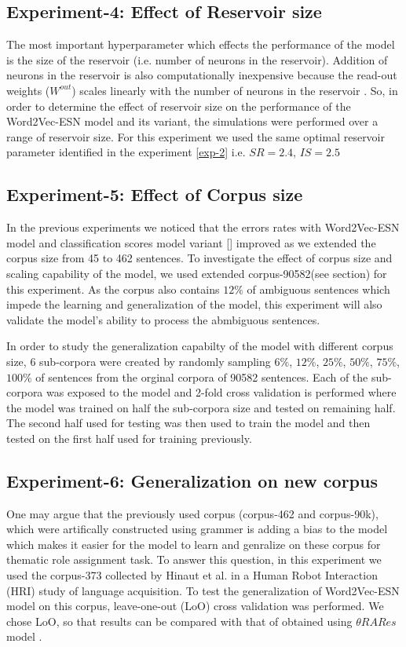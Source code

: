 \subsection{Experiment-4: Effect of Reservoir size}

The most important hyperparameter which effects the performance of the model is the size of the reservoir (i.e. number of neurons in the reservoir). Addition of neurons in the reservoir is also computationally inexpensive because the read-out weights ($W^{out}$) scales linearly with the number of neurons in the reservoir \cite{esn:learn_gs}. So, in order to determine the effect of reservoir size on the performance of the Word2Vec-ESN model and its variant, the simulations were performed over a range of reservoir size. For this experiment we used the same optimal reservoir parameter identified in the experiment \ref{exp-2} i.e. $ SR = 2.4$, $IS=2.5$

\subsection{Experiment-5: Effect of Corpus size}

In the previous experiments we noticed that the errors rates with Word2Vec-ESN model and classification scores model variant [] improved as we extended the corpus size from 45 to 462 sentences. To investigate the effect of corpus size and scaling capability of the model, we used extended corpus-90582(see section) for this experiment. As the corpus also contains $12\%$ of ambiguous sentences which impede the learning and generalization of the model, this experiment will also validate the model's ability to process the abmbiguous sentences.

In order to study the generalization capabilty of the model with different corpus size,  6 sub-corpora were created by randomly sampling $6\%$, $12\%$, $25\%$, $50\%$, $75\%$, $100\%$ of sentences from the orginal corpora of 90582 sentences\cite{end-to-end}. Each of the sub-corpora was exposed to the model and 2-fold cross validation is performed where the model was trained on half the sub-corpora size and tested on remaining half. The second half used for testing was then used to train the model and then tested on the first half used for training previously.

\subsection{Experiment-6: Generalization on new corpus}

One may argue that the previously used corpus (corpus-462 and corpus-90k), which were artifically constructed using grammer is adding a bias to the model which makes it easier for the model to learn and genralize on these corpus for thematic role assignment task. To answer this question, in this experiment we used the corpus-373 collected by Hinaut et al. \cite{tra:tra:xavier_hri} in a Human Robot Interaction (HRI) study of language acquisition. To test the generalization of Word2Vec-ESN model on this corpus, leave-one-out (LoO) cross validation was performed. We chose LoO, so that results can be compared with that of obtained using $\theta RARes$ model \cite{tra:tra:xavier_hri}.